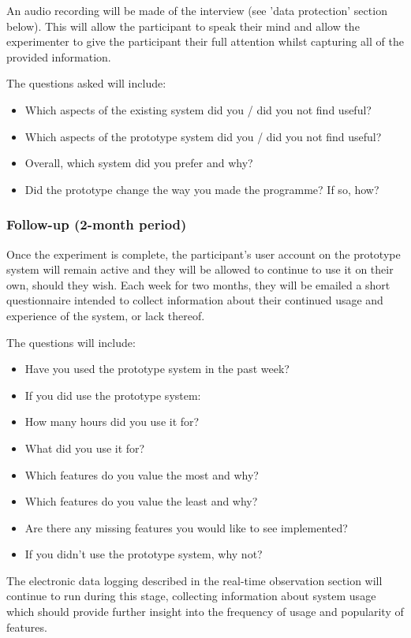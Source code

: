 An audio recording will be made of the interview (see 'data protection' section
below). This will allow the participant to speak their mind and allow the
experimenter to give the participant their full attention whilst capturing all
of the provided information.

The questions asked will include:
\begin{itemize}
\item Which aspects of the existing system did you / did you not find useful?
\item Which aspects of the prototype system did you / did you not find useful?
\item Overall, which system did you prefer and why?
\item Did the prototype change the way you made the programme? If so, how?
\end{itemize}

\subsubsection{Follow-up (2-month period)}
Once the experiment is complete, the participant's user account on the
prototype system will remain active and they will be allowed to continue to use
it on their own, should they wish. Each week for two months, they will be
emailed a short questionnaire intended to collect information about their
continued usage and experience of the system, or lack thereof.

The questions will include:
\begin{itemize}
\item Have you used the prototype system in the past week?
\item If you did use the prototype system:
\item How many hours did you use it for?
\item What did you use it for?
\item Which features do you value the most and why?
\item Which features do you value the least and why?
\item Are there any missing features you would like to see implemented?
\item If you didn't use the prototype system, why not?
\end{itemize}

The electronic data logging described in the real-time observation section will
continue to run during this stage, collecting information about system usage
which should provide further insight into the frequency of usage and popularity
of features.

